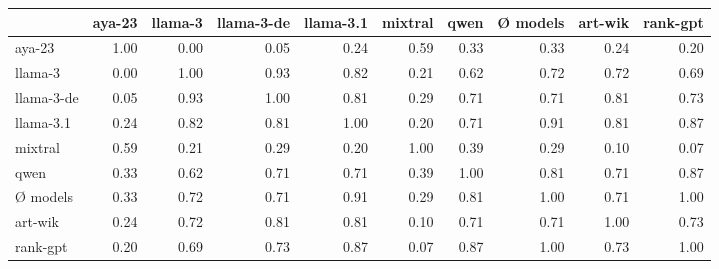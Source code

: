 \begin{tabular}{lrrrrrrrrr}
\toprule
 & aya-23 & llama-3 & llama-3-de & llama-3.1 & mixtral & qwen & Ø models & art-wik & rank-gpt \\
\midrule
aya-23 & 1.00 & 0.00 & 0.05 & 0.24 & 0.59 & 0.33 & 0.33 & 0.24 & 0.20 \\
llama-3 & 0.00 & 1.00 & 0.93 & 0.82 & 0.21 & 0.62 & 0.72 & 0.72 & 0.69 \\
llama-3-de & 0.05 & 0.93 & 1.00 & 0.81 & 0.29 & 0.71 & 0.71 & 0.81 & 0.73 \\
llama-3.1 & 0.24 & 0.82 & 0.81 & 1.00 & 0.20 & 0.71 & 0.91 & 0.81 & 0.87 \\
mixtral & 0.59 & 0.21 & 0.29 & 0.20 & 1.00 & 0.39 & 0.29 & 0.10 & 0.07 \\
qwen & 0.33 & 0.62 & 0.71 & 0.71 & 0.39 & 1.00 & 0.81 & 0.71 & 0.87 \\
Ø models & 0.33 & 0.72 & 0.71 & 0.91 & 0.29 & 0.81 & 1.00 & 0.71 & 1.00 \\
art-wik & 0.24 & 0.72 & 0.81 & 0.81 & 0.10 & 0.71 & 0.71 & 1.00 & 0.73 \\
rank-gpt & 0.20 & 0.69 & 0.73 & 0.87 & 0.07 & 0.87 & 1.00 & 0.73 & 1.00 \\
\bottomrule
\end{tabular}
